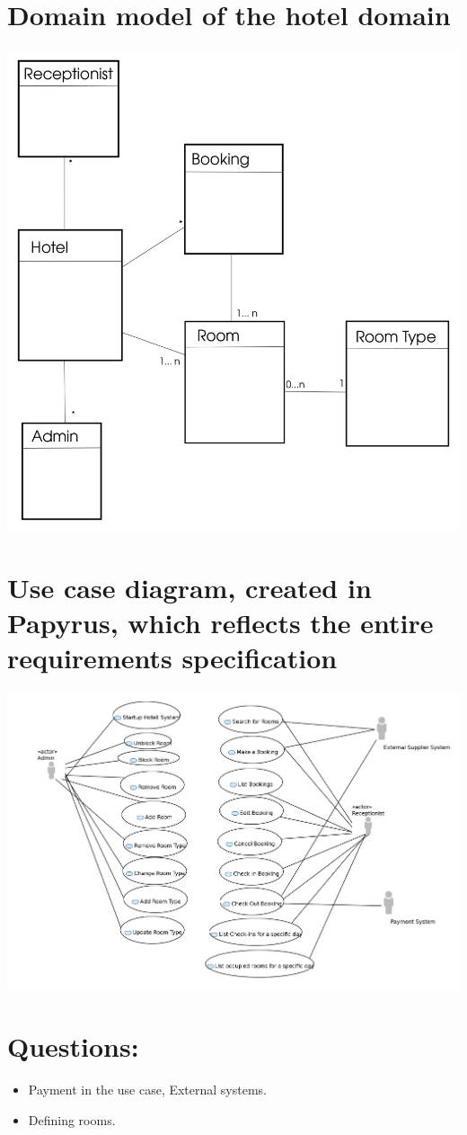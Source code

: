 \documentclass[utf8]{article}
\begin{document}
	\section{Domain model of the hotel domain}
	\includegraphics[scale=0.2]{ClassDiagram}
	\section{Use case diagram, created in Papyrus, which reflects the entire requirements specification}
	\includegraphics[scale=0.2]{use-case-diagram}
	\section{Questions:}
	\begin{itemize}
		\item Payment in the use case, External systems.
		\item Defining rooms.
	\end{itemize}
\end{document}
